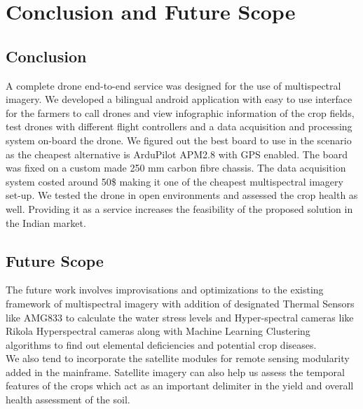 \chapter{Conclusion and Future Scope}
\section{Conclusion}
A complete drone end-to-end service was designed for the use of multispectral imagery. We developed a bilingual android application with easy to use interface for the farmers to call drones and view infographic information of the crop fields, test drones with different flight controllers and a data acquisition and processing system on-board the drone. We figured out the best board to use in the scenario as the cheapest alternative is ArduPilot APM2.8 with GPS enabled. The board was fixed on a custom made 250 mm carbon fibre chassis. The data acquisition system costed around 50\$ making it one of the cheapest multispectral imagery set-up. We tested the drone in open environments and assessed the crop health as well. Providing it as a service increases the feasibility of the proposed solution in the Indian market.
\section{Future Scope}
The future work involves improvisations and optimizations to the existing framework of multispectral imagery with addition of designated Thermal Sensors like AMG833 to calculate the water stress levels and Hyper-spectral cameras like Rikola Hyperspectral cameras along with Machine Learning Clustering algorithms to find out elemental deficiencies and potential crop diseases.
\\
We also tend to incorporate the satellite modules for remote sensing modularity added in the mainframe. Satellite imagery can also help us assess the temporal features of the crops which act as an important delimiter in the yield and overall health assessment of the soil.

